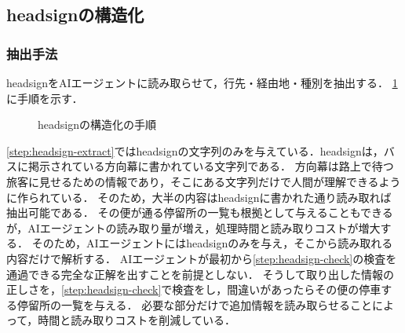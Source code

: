 \subsection{headsignの構造化}
\label{subsection:headsign-method}
\subsubsection{抽出手法}
headsignをAIエージェントに読み取らせて，行先・経由地・種別を抽出する．
\cref{fig:headsign-procedure}に手順を示す．

\begin{figure}[t]
    \centering
    \setlength{\fboxsep}{8pt}
    \caption{headsignの構造化の手順}
    \label{fig:headsign-procedure}
\end{figure}

\cref{step:headsign-extract}ではheadsignの文字列のみを与えている．headsignは，バスに掲示されている方向幕に書かれている文字列である．
方向幕は路上で待つ旅客に見せるための情報であり，そこにある文字列だけで人間が理解できるように作られている．
そのため，大半の内容はheadsignに書かれた通り読み取れば抽出可能である．
その便が通る停留所の一覧も根拠として与えることもできるが，AIエージェントの読み取り量が増え，処理時間と読み取りコストが増大する．
そのため，AIエージェントにはheadsignのみを与え，そこから読み取れる内容だけで解析する．
AIエージェントが最初から\cref{step:headsign-check}の検査を通過できる完全な正解を出すことを前提としない．
そうして取り出した情報の正しさを，\cref{step:headsign-check}で検査をし，間違いがあったらその便の停車する停留所の一覧を与える．
必要な部分だけで追加情報を読み取らせることによって，時間と読み取りコストを削減している． %

